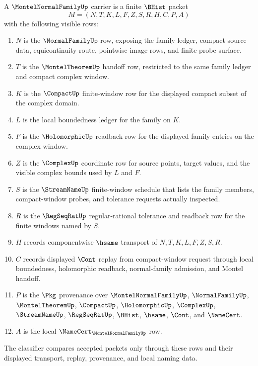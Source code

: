 \begin{definition}
\label{def:montel-normal-family-carrier}
A $\MontelNormalFamilyUp$ carrier is a finite $\BHist$ packet
$$
M=(N,T,K,L,F,Z,S,R,H,C,P,A)
$$
with the following visible rows:
\begin{enumerate}
\item $N$ is the $\NormalFamilyUp$ row, exposing the family ledger, compact source data, equicontinuity route, pointwise image rows, and finite probe surface.
\item $T$ is the $\MontelTheoremUp$ handoff row, restricted to the same family ledger and compact complex window.
\item $K$ is the $\CompactUp$ finite-window row for the displayed compact subset of the complex domain.
\item $L$ is the local boundedness ledger for the family on $K$.
\item $F$ is the $\HolomorphicUp$ readback row for the displayed family entries on the complex window.
\item $Z$ is the $\ComplexUp$ coordinate row for source points, target values, and the visible complex bounds used by $L$ and $F$.
\item $S$ is the $\StreamNameUp$ finite-window schedule that lists the family members, compact-window probes, and tolerance requests actually inspected.
\item $R$ is the $\RegSeqRatUp$ regular-rational tolerance and readback row for the finite windows named by $S$.
\item $H$ records componentwise $\hsame$ transport of $N,T,K,L,F,Z,S,R$.
\item $C$ records displayed $\Cont$ replay from compact-window request through local boundedness, holomorphic readback, normal-family admission, and Montel handoff.
\item $P$ is the $\Pkg$ provenance over $\MontelNormalFamilyUp$, $\NormalFamilyUp$, $\MontelTheoremUp$, $\CompactUp$, $\HolomorphicUp$, $\ComplexUp$, $\StreamNameUp$, $\RegSeqRatUp$, $\BHist$, $\hsame$, $\Cont$, and $\NameCert$.
\item $A$ is the local $\NameCert_{\MontelNormalFamilyUp}$ row.
\end{enumerate}
The classifier compares accepted packets only through these rows and their displayed transport, replay, provenance, and local naming data.
\end{definition}

